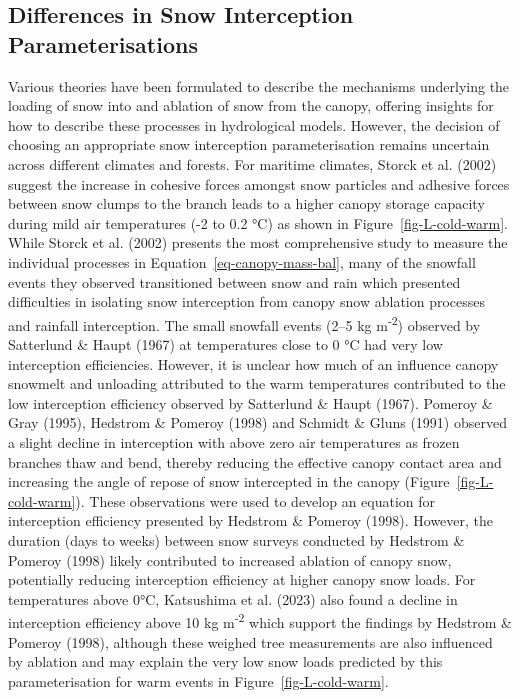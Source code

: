 \documentclass[
  letterpaper,
]{tex/uofsthesis-cs}
\begin{document}
\subsection{Differences in Snow Interception
Parameterisations}\label{differences-in-snow-interception-parameterisations}

Various theories have been formulated to describe the mechanisms
underlying the loading of snow into and ablation of snow from the
canopy, offering insights for how to describe these processes in
hydrological models. However, the decision of choosing an appropriate
snow interception parameterisation remains uncertain across different
climates and forests. For maritime climates, Storck et al. (2002)
suggest the increase in cohesive forces amongst snow particles and
adhesive forces between snow clumps to the branch leads to a higher
canopy storage capacity during mild air temperatures (-2 to 0.2 °C) as
shown in Figure~\ref{fig-L-cold-warm}. While Storck et al. (2002)
presents the most comprehensive study to measure the individual
processes in Equation~\ref{eq-canopy-mass-bal}, many of the snowfall
events they observed transitioned between snow and rain which presented
difficulties in isolating snow interception from canopy snow ablation
processes and rainfall interception. The small snowfall events (2--5 kg
m\textsuperscript{-2}) observed by Satterlund \& Haupt (1967) at
temperatures close to 0 °C had very low interception efficiencies.
However, it is unclear how much of an influence canopy snowmelt and
unloading attributed to the warm temperatures contributed to the low
interception efficiency observed by Satterlund \& Haupt (1967). Pomeroy
\& Gray (1995), Hedstrom \& Pomeroy (1998) and Schmidt \& Gluns (1991)
observed a slight decline in interception with above zero air
temperatures as frozen branches thaw and bend, thereby reducing the
effective canopy contact area and increasing the angle of repose of snow
intercepted in the canopy (Figure~\ref{fig-L-cold-warm}). These
observations were used to develop an equation for interception
efficiency presented by Hedstrom \& Pomeroy (1998). However, the
duration (days to weeks) between snow surveys conducted by Hedstrom \&
Pomeroy (1998) likely contributed to increased ablation of canopy snow,
potentially reducing interception efficiency at higher canopy snow
loads. For temperatures above 0°C, Katsushima et al. (2023) also found a
decline in interception efficiency above 10 kg m\textsuperscript{-2}
which support the findings by Hedstrom \& Pomeroy (1998), although these
weighed tree measurements are also influenced by ablation and may
explain the very low snow loads predicted by this parameterisation for
warm events in Figure~\ref{fig-L-cold-warm}.
\end{document}
